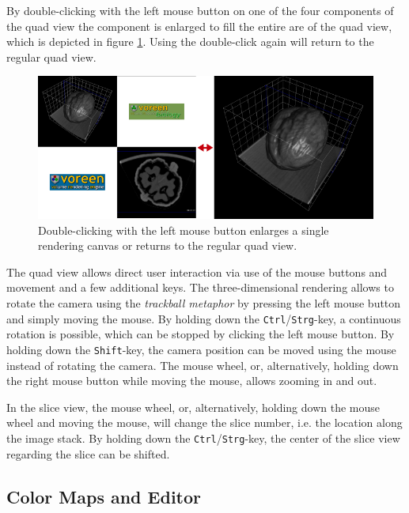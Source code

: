 By double-clicking with the left mouse button on one of the four components of the quad view the component is enlarged to fill the entire are of the quad
view, which is depicted in figure \ref{fig:quadview_resizing}. Using the double-click again will return to the regular quad view.

\begin{figure}[htb]
 \centering
 \includegraphics[scale=0.85,keepaspectratio=true]{./images/quadview_resizing2.png}
 \caption{Double-clicking with the left mouse button enlarges a single rendering canvas or returns to the regular quad view.}
 \label{fig:quadview_resizing}
\end{figure}

The quad view allows direct user interaction via use of the mouse buttons and movement and a few additional keys. The three-dimensional
rendering allows to rotate the camera using the \emph{trackball metaphor} by pressing the left mouse button and simply moving the mouse. By holding 
down the \verb|Ctrl|/\verb|Strg|-key, a continuous rotation is possible, which can be stopped by clicking the left mouse button. By holding down the 
\verb|Shift|-key, the camera position can be moved using the mouse instead of rotating the camera. The mouse wheel, or, alternatively, holding down 
the right mouse button while moving the mouse, allows zooming in and out. 

In the slice view, the mouse wheel, or, alternatively, holding down the mouse wheel and moving the mouse, will change the slice number, i.e. the location
along the image stack. By holding down the \verb|Ctrl|/\verb|Strg|-key, the center of the slice view regarding the slice can be shifted.

\subsection{Color Maps and Editor}
\label{section:color_map}

